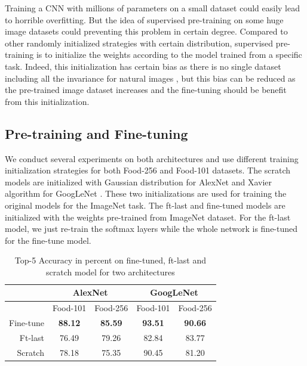 ﻿Training a CNN with millions of parameters on a small dataset could easily lead to horrible overfitting. But the idea of supervised pre-training on some huge image datasets could preventing this problem in certain degree. Compared to other randomly initialized strategies with certain distribution, supervised pre-training is to initialize the weights according to the model trained from a specific task. Indeed, this initialization has certain bias as there is no single dataset including all the invariance for natural images \cite{agrawal2014analyzing}, but this bias can be reduced as the pre-trained image dataset increases and the fine-tuning should be benefit from this initialization.
\subsection{Pre-training and Fine-tuning}
We conduct several experiments on both architectures and use different training initialization strategies for both Food-256 and Food-101 datasets. The scratch models are initialized with Gaussian distribution for AlexNet and Xavier algorithm for GoogLeNet%
 \cite{glorot2010understanding}. These two initializations are used for training the original models for the ImageNet task. The ft-last and fine-tuned models are initialized with the weights pre-trained from ImageNet dataset. For the ft-last model, we just re-train the softmax layers while the whole network is fine-tuned for the fine-tune model.
\begin{table}[htbp]
  \centering
  \caption{Top-5 Accuracy in percent on fine-tuned, ft-last and scratch model for two architectures}
    \begin{tabular}{r|cc|cc}
    \toprule
          & \multicolumn{2}{c|}{AlexNet} & \multicolumn{2}{c}{GoogLeNet} \\    \midrule
     & Food-101   & Food-256   & Food-101   & Food-256 \\
    Fine-tune & \textbf{88.12} & \textbf{85.59} & \textbf{93.51} & \textbf{90.66} \\
    Ft-last &76.49	&79.26&	82.84	&83.77\\
    Scratch & 78.18 & 75.35 & 90.45 & 81.20 \\
    \bottomrule
    \end{tabular}%
  \label{tab:ft}%
\end{table}%


